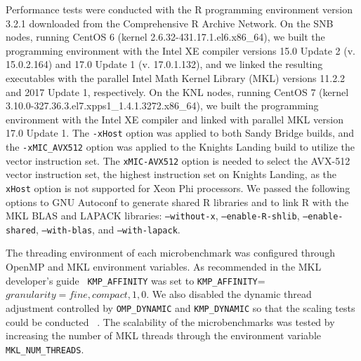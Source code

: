 Performance tests were conducted with the R programming environment version 3.2.1
downloaded from the Comprehensive R Archive Network. On the SNB nodes, running CentOS 6
(kernel 2.6.32-431.17.1.el6.x86\_64), we built the programming environment with the Intel
XE compiler versions 15.0 Update 2 (v. 15.0.2.164) and 17.0 Update 1 (v. 17.0.1.132), and
we linked the resulting executables with the parallel Intel Math Kernel Library (MKL)
versions 11.2.2 and 2017 Update 1, respectively. On the KNL nodes, running CentOS 7
(kernel 3.10.0-327.36.3.el7.xpps1\_1.4.1.3272.x86\_64), we built the programming
environment with the Intel XE compiler and linked with parallel MKL version 17.0 Update 1.
The \texttt{-xHost} option was applied to both Sandy Bridge builds, and the
\texttt{-xMIC\_AVX512} option was applied to the Knights Landing build to utilize the
vector instruction set. The \texttt{xMIC-AVX512} option is needed to select the AVX-512
vector instruction set, the highest instruction set on Knights Landing, as the
\texttt{xHost} option is not supported for Xeon Phi processors. We passed the following
options to GNU Autoconf to generate shared R libraries and to link R with the MKL BLAS and
LAPACK libraries: \texttt{--without-x}, \texttt{--enable-R-shlib},
\texttt{--enable-shared}, \texttt{--with-blas}, and \texttt{--with-lapack}.

The threading environment of each microbenchmark was configured through OpenMP and MKL
environment variables. As recommended in the MKL developer's guide~\cite{intel:mkl2017}
\texttt{KMP\_AFFINITY} was set to \texttt{KMP\_AFFINITY}=$granularity=fine,compact,1,0$.
We also disabled the dynamic thread adjustment controlled by \texttt{OMP\_DYNAMIC} and
\texttt{KMP\_DYNAMIC} so that the scaling tests could be conducted ~\cite{intel:cpp2015,
intel:cpp2017, intel:mkl11_2, intel:mkl2017}. The scalability of the microbenchmarks was
tested by increasing the number of MKL threads through the environment variable
\texttt{MKL\_NUM\_THREADS}.

